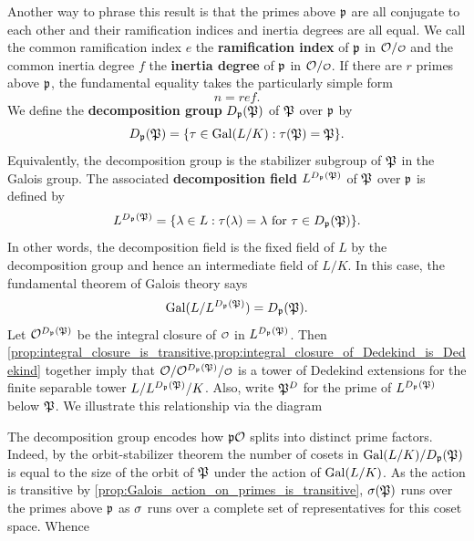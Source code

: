     Another way to phrase this result is that the primes above \(\mathfrak{p}\) are all conjugate to each other and their ramification indices and inertia degrees are all equal. We call the common ramification index \(e\) the \textbf{ramification index} of \(\mathfrak{p}\) in \(\mc{O}/\smc{O}\) and the common inertia degree \(f\) the \textbf{inertia degree} of \(\mathfrak{p}\) in \(\mc{O}/\smc{O}\). If there are \(r\) primes above \(\mathfrak{p}\), the fundamental equality takes the particularly simple form
    \[
      n = ref.
    \]
    We define the \textbf{decomposition group} \(D_{\mathfrak{p}}(\mathfrak{P})\) of \(\mathfrak{P}\) over \(\mathfrak{p}\) by
    \[
      D_{\mathfrak{p}}(\mathfrak{P}) = \{\tau \in \operatorname{\mathrm{Gal}}(L/K):\tau(\mathfrak{P}) = \mathfrak{P}\}.
    \]
    Equivalently, the decomposition group is the stabilizer subgroup of \(\mathfrak{P}\) in the Galois group. The associated \textbf{decomposition field} \(L^{D_{\mathfrak{p}}(\mathfrak{P})}\) of \(\mathfrak{P}\) over \(\mathfrak{p}\) is defined by
    \[
      L^{D_{\mathfrak{p}}(\mathfrak{P})} = \{\lambda \in L:\tau(\lambda) = \lambda \text{ for } \tau \in D_{\mathfrak{p}}(\mathfrak{P})\}.
    \]
    In other words, the decomposition field is the fixed field of \(L\) by the decomposition group and hence an intermediate field of \(L/K\). In this case, the fundamental theorem of Galois theory says
    \[
      \operatorname{\mathrm{Gal}}(L/L^{D_{\mathfrak{p}}(\mathfrak{P})}) = D_{\mathfrak{p}}(\mathfrak{P}).
    \]
    Let \(\mathcal{O}^{D_{\mathfrak{p}}(\mathfrak{P})}\) be the integral closure of \(\smc{O}\) in \(L^{D_{\mathfrak{p}}(\mathfrak{P})}\). Then \cref{prop:integral_closure_is_transitive,prop:integral_closure_of_Dedekind_is_Dedekind} together imply that \(\mc{O}/\mc{O}^{D_{\mf{p}}(\mf{P})}/\smc{O}\) is a tower of Dedekind extensions for the finite separable tower \(L/L^{D_{\mathfrak{p}}(\mathfrak{P})}/K\). Also, write \(\mathfrak{P}^{D}\) for the prime of \(L^{D_{\mathfrak{p}}(\mathfrak{P})}\) below \(\mathfrak{P}\). We illustrate this relationship via the diagram
    \begin{center}
    \end{center}
    The decomposition group encodes how \(\mathfrak{p}\mathcal{O}\) splits into distinct prime factors. Indeed, by the orbit-stabilizer theorem the number of cosets in \(\operatorname{\mathrm{Gal}}(L/K)/D_{\mathfrak{p}}(\mathfrak{P})\) is equal to the size of the orbit of \(\mathfrak{P}\) under the action of \(\operatorname{\mathrm{Gal}}(L/K)\). As the action is transitive by \cref{prop:Galois_action_on_primes_is_transitive}, \(\sigma(\mathfrak{P})\) runs over the primes above \(\mathfrak{p}\) as \(\sigma\) runs over a complete set of representatives for this coset space. Whence
